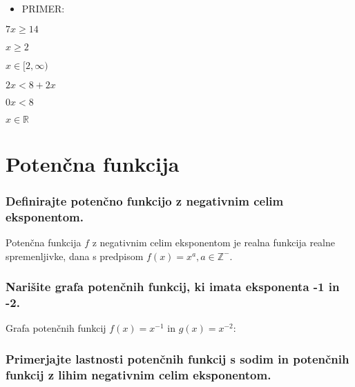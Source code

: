 \documentclass{article}
\begin{document}
\begin{itemize}
  \item PRIMER:
\end{itemize}

$7 x \geq 14$

$x \geq 2$

$x \in[2, \infty)$

$2 x<8+2 x$

$0 x<8$

$x \in \mathbb{R}$

\section{Potenčna funkcija}
\subsubsection*{Definirajte potenčno funkcijo z negativnim celim eksponentom.}

Potenčna funkcija $f$ z negativnim celim eksponentom je realna funkcija realne spremenljivke, dana s predpisom $f(x)=x^{a}, a \in \mathbb{Z}^{-}$.

\subsubsection*{Narišite grafa potenčnih funkcij, ki imata eksponenta -1 in -2.}

Grafa potenčnih funkcij $f(x)=x^{-1}$ in $g(x)=x^{-2}$:


\subsubsection*{Primerjajte lastnosti potenčnih funkcij s sodim in potenčnih funkcij z lihim negativnim celim eksponentom.}
\end{document}
